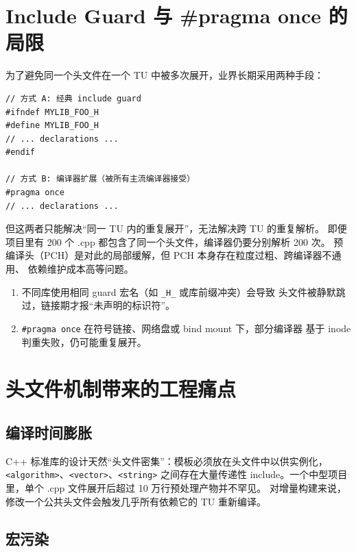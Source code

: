 \documentclass[12pt,a4paper,fontset=fandol]{ctexbook}
\newcommand{\cpplabel}{%
  \tcbox[on line,colback=cppheadbg,colframe=cppheadbg,
    boxrule=0pt,arc=1pt,left=2pt,right=2pt,top=1pt,bottom=1pt,
    colupper=white,fontupper=\scriptsize\bfseries]{C++}}
\newcommand{\flag}[1]{\texttt{#1}}
\begin{document}
\section{Include Guard 与 \#pragma once 的局限}

为了避免同一个头文件在一个 TU 中被多次展开，业界长期采用两种手段：

\cpplabel
\begin{lstlisting}[style=cppstyle]
// 方式 A: 经典 include guard
#ifndef MYLIB_FOO_H
#define MYLIB_FOO_H
// ... declarations ...
#endif

// 方式 B: 编译器扩展（被所有主流编译器接受）
#pragma once
// ... declarations ...
\end{lstlisting}

但这两者只能解决“同一 TU 内的重复展开”，无法解决跨 TU 的重复解析。
即便项目里有 200 个 .cpp 都包含了同一个头文件，编译器仍要分别解析 200 次。
预编译头（PCH）是对此的局部缓解，但 PCH 本身存在粒度过粗、跨编译器不通用、
依赖维护成本高等问题。

\begin{warning}[title=include guard 的两个常见坑]
\begin{enumerate}
  \item 不同库使用相同 guard 宏名（如 \texttt{\_H\_} 或库前缀冲突）会导致
        头文件被静默跳过，链接期才报“未声明的标识符”。
  \item \flag{\#pragma once} 在符号链接、网络盘或 bind mount 下，部分编译器
        基于 inode 判重失败，仍可能重复展开。
\end{enumerate}
\end{warning}

\section{头文件机制带来的工程痛点}

\subsection{编译时间膨胀}

C++ 标准库的设计天然“头文件密集”：模板必须放在头文件中以供实例化，
\texttt{<algorithm>}、\texttt{<vector>}、\texttt{<string>} 之间存在大量传递性
include。一个中型项目里，单个 .cpp 文件展开后超过 10 万行预处理产物并不罕见。
对增量构建来说，修改一个公共头文件会触发几乎所有依赖它的 TU 重新编译。

\subsection{宏污染}
\end{document}
